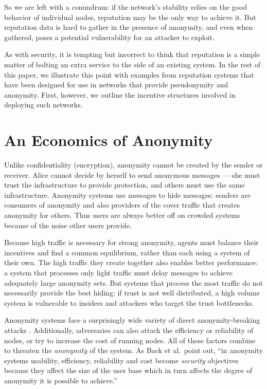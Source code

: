 \documentclass[times,10pt,twocolumn]{article}
\begin{document}
So we are left with a conundrum: if the network's stability relies
on the good behavior of individual nodes, reputation may be the
only way to achieve it.  But reputation data is hard to gather in
the presence of anonymity, and even when gathered, poses a potential
vulnerability for an attacker to exploit.

As with security, it is tempting but incorrect to think that
reputation is a simple matter of bolting an extra service to the side
of an existing system.  In the rest of this paper, we illustrate this
point with examples from reputation systems that have been designed
for use in networks that provide pseudonymity and anonymity.  First,
however, we outline the incentive structures involved in deploying
such networks.

\section{An Economics of Anonymity}

Unlike confidentiality (encryption), anonymity cannot be created by the
sender or receiver. Alice cannot decide by herself to send anonymous
messages --- she must trust the infrastructure to provide protection, and
others must use the same infrastructure. Anonymity systems use messages
to hide messages: senders are consumers of anonymity and also providers
of the cover traffic that creates anonymity for others. Thus users are
always better off on crowded systems because of the noise other users provide.

Because high traffic is necessary for strong anonymity, agents must
balance their incentives and find a common equilibrium, rather than
each using a system of their own.
The high traffic they create together
also enables better performance: a system that processes only light
traffic must delay messages to achieve adequately large anonymity sets.
But systems that process the most traffic do not necessarily provide the
best hiding: if trust is not well distributed, a high volume system is
vulnerable to insiders and attackers who target the trust bottlenecks.

Anonymity systems face a surprisingly wide variety of direct
anonymity-breaking attacks \cite{back01,raymond00}. Additionally,
adversaries can also attack the efficiency or reliability of nodes, or
try to increase the cost of running nodes. All of these factors combine
to threaten the \emph{anonymity} of the system.  As Back et al.\ point
out, ``in anonymity systems usability, efficiency, reliability and cost
become \emph{security} objectives because they affect the size of the
user base which in turn affects the degree of anonymity it is possible
to achieve.'' \cite{back01}
\end{document}
